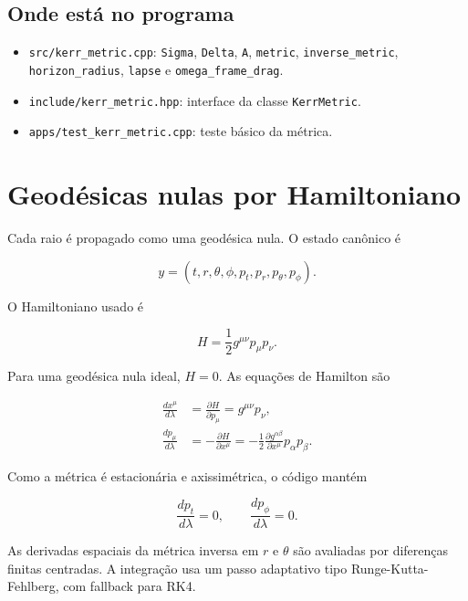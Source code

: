 \documentclass[11pt,a4paper]{article}
\begin{document}
\subsection*{Onde está no programa}

\begin{itemize}
  \item \texttt{src/kerr\_metric.cpp}: \texttt{Sigma}, \texttt{Delta},
  \texttt{A}, \texttt{metric}, \texttt{inverse\_metric},
  \texttt{horizon\_radius}, \texttt{lapse} e
  \texttt{omega\_frame\_drag}.
  \item \texttt{include/kerr\_metric.hpp}: interface da classe
  \texttt{KerrMetric}.
  \item \texttt{apps/test\_kerr\_metric.cpp}: teste básico da métrica.
\end{itemize}

\section{Geodésicas nulas por Hamiltoniano}

Cada raio é propagado como uma geodésica nula. O estado canônico é

\begin{equation}
  y = (t,r,\theta,\phi,p_t,p_r,p_\theta,p_\phi).
\end{equation}

O Hamiltoniano usado é

\begin{equation}
  H = \frac{1}{2}g^{\mu\nu}p_\mu p_\nu.
\end{equation}

Para uma geodésica nula ideal, $H=0$. As equações de Hamilton são

\begin{align}
  \frac{dx^\mu}{d\lambda} &= \frac{\partial H}{\partial p_\mu}
  = g^{\mu\nu}p_\nu,\\
  \frac{dp_\mu}{d\lambda} &= -\frac{\partial H}{\partial x^\mu}
  = -\frac{1}{2}\frac{\partial g^{\alpha\beta}}
  {\partial x^\mu}p_\alpha p_\beta.
\end{align}

Como a métrica é estacionária e axissimétrica, o código mantém

\begin{equation}
  \frac{dp_t}{d\lambda}=0,\qquad
  \frac{dp_\phi}{d\lambda}=0.
\end{equation}

As derivadas espaciais da métrica inversa em $r$ e $\theta$ são avaliadas por
diferenças finitas centradas. A integração usa um passo adaptativo tipo
Runge-Kutta-Fehlberg, com fallback para RK4.
\end{document}
